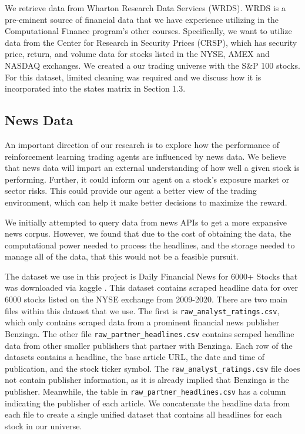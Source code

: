 We retrieve data from Wharton Research Data Services 
(WRDS). WRDS is a pre-eminent source of financial data that we have experience 
utilizing in the Computational Finance program’s other courses. Specifically, we want to utilize data from the Center for Research in 
Security Prices (CRSP), which has security price, return, and volume data for stocks listed in the 
NYSE, AMEX and NASDAQ exchanges. We created a our trading universe with the S$\&$P 100 stocks. 
For this dataset, limited cleaning was required and we discuss how it is incorporated into the states matrix in Section 1.3.

\subsection{News Data}

An important direction of our research is to explore how the performance 
of reinforcement learning trading agents are influenced by news data.
We believe that news data will impart an external understanding of how 
well a given stock is performing. Further, it could inform our agent on a stock's exposure market or sector risks. 
This could provide our agent a better view of the trading environment, which 
can help it make better decisions to maximize the reward. 

We initially attempted to query data from news APIs to get a more expansive news corpus. However, we found that due to the cost of obtaining the data, the computational power needed to process the headlines, and the storage needed to manage all of the data, that this would not be a feasible pursuit.

The dataset we use in this project is Daily Financial News for 6000+ Stocks that was downloaded via kaggle \cite{financial_news}.
This dataset contains scraped headline data for over 6000 stocks listed on the NYSE exchange from 2009-2020. 
There are two main files within this dataset that we use. The first is \texttt{raw\_analyst\_ratings.csv}, which only contains scraped data from a prominent financial news publisher Benzinga.
The other file \texttt{raw\_partner\_headlines.csv} contains scraped headline data from other smaller publishers that partner with Benzinga. Each row of the datasets contains a headline, the base article URL, the date and time of publication, and the stock ticker symbol.
The \texttt{raw\_analyst\_ratings.csv} file does not contain publisher information, as it is already implied that Benzinga is the publisher. Meanwhile, the table in \texttt{raw\_partner\_headlines.csv} has a column indicating the publisher of each article. 
We concatenate the headline data from each file to create a single unified dataset that contains all headlines for each stock in our universe.


